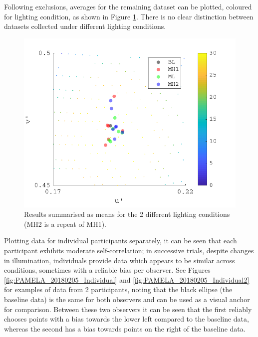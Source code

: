 Following exclusions, averages for the remaining dataset can be plotted, coloured for lighting condition, as shown in Figure \ref{fig:PAMELA_20180205_results}. There is no clear distinction between datasets collected under different lighting conditions.

\begin{figure}[hbtp] %
\includegraphics[max width=\textwidth]{figs/tablet/PAMELA_20180205_results.pdf} 
\caption{Results summarised as means for the 2 different lighting conditions (MH2 is a repeat of MH1).}
\label{fig:PAMELA_20180205_results}
\end{figure}

Plotting data for individual participants separately, it can be seen that each participant exhibits moderate self-correlation; in successive trials, despite changes in illumination, individuals provide data which appears to be similar across conditions, sometimes with a reliable bias per observer. See Figures \ref{fig:PAMELA_20180205_Individual} and \ref{fig:PAMELA_20180205_Individual2} for examples of data from 2 participants, noting that the black ellipse (the baseline data) is the same for both observers and can be used as a visual anchor for comparison. Between these two observers it can be seen that the first reliably chooses points with a bias towards the lower left compared to the baseline data, whereas the second has a bias towards points on the right of the baseline data. 

